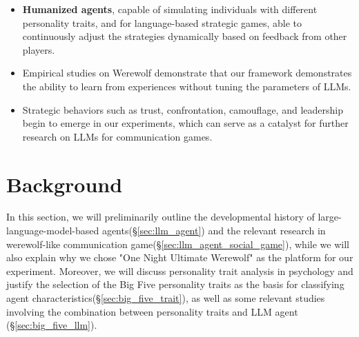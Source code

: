 \documentclass[11pt]{article}
\begin{document}
\begin{itemize} 
  \item {\bf Humanized agents}, capable of simulating individuals with different personality traits, and for language-based strategic games, able to continuously adjust the strategies dynamically based on feedback from other players.
  \item {\color{red}}Empirical studies on Werewolf demonstrate that our framework demonstrates the ability to learn from experiences without tuning the parameters of LLMs.
  \item Strategic behaviors such as trust, confrontation, camouflage, and leadership begin to emerge in our experiments, which can serve as a catalyst for further research on LLMs for communication games.
\end{itemize}



\section{Background}
In this section, we will preliminarily outline the developmental history of large-language-model-based agents(\S\ref{sec:llm_agent}) and the relevant research in werewolf-like communication game(\S\ref{sec:llm_agent_social_game}), while we will also explain why we chose "One Night Ultimate Werewolf" as the platform for our experiment. Moreover, we will discuss personality trait analysis in psychology and justify the selection of the Big Five personality traits as the basis for classifying agent characteristics(\S\ref{sec:big_five_trait}), as well as some relevant studies involving the combination between personality traits and LLM agent (\S\ref{sec:big_five_llm}).
\end{document}
